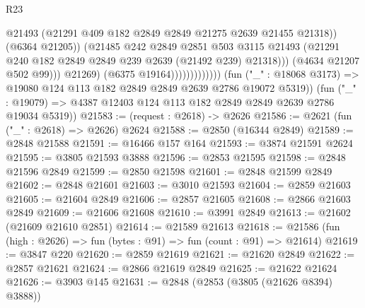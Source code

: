 \begin{lexlean}{R23}
\begin{coremodule}
                                            @21493
                                            (@21291
                                              @409
                                              @182
                                              @2849
                                              @2849
                                              @21275
                                              @2639
                                              @21455
                                              @21318))
                                          (@6364 @21205))
                                        (@21485
                                          @242
                                          @2849
                                          @2851
                                          @503
                                          @3115
                                          @21493
                                          (@21291
                                            @240
                                            @182
                                            @2849
                                            @2849
                                            @239
                                            @2639
                                            (@21492 @239)
                                            @21318)))
                                      (@4634 @21207 @502 @99)))
                                  @21269)
                                (@6375 @19164)))))))))))))
        (fun ("_" : @18068 @3173) => @19080 @124 @113 @182 @2849 @2849 @2639 @2786 @19072 @5319))
      (fun ("_" : @19079) => @4387 @12403 @124 @113 @182 @2849 @2849 @2639 @2786 @19034 @5319))
@21583 := (request : @2618) -> @2626
@21586 := @2621 (fun ("_" : @2618) => @2626) @2624
@21588 := @2850 (@16344 @2849)
@21589 := @2848 @21588
@21591 := @16466 @157 @164
@21593 := @3874 @21591 @2624
@21595 := @3805 @21593 @3888
@21596 := @2853 @21595
@21598 := @2848 @21596 @2849
@21599 := @2850 @21598
@21601 := @2848 @21599 @2849
@21602 := @2848 @21601
@21603 := @3010 @21593
@21604 := @2859 @21603
@21605 := @21604 @2849
@21606 := @2857 @21605
@21608 := @2866 @21603 @2849
@21609 := @21606 @21608
@21610 := @3991 @2849
@21613 := @21602 (@21609 @21610 @2851)
@21614 := @21589 @21613
@21618 := @21586 (fun (high : @2626) => fun (bytes : @91) => fun (count : @91) => @21614)
@21619 := @3847 @220
@21620 := @2859 @21619
@21621 := @21620 @2849
@21622 := @2857 @21621
@21624 := @2866 @21619 @2849
@21625 := @21622 @21624
@21626 := @3903 @145
@21631 := @2848 (@2853 (@3805 (@21626 @8394) @3888))

\end{coremodule}
\end{lexlean}
